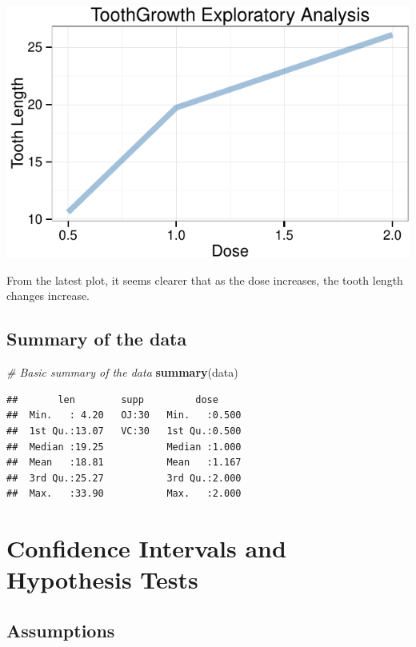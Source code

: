 \documentclass[]{article}
\newenvironment{Shaded}{\begin{snugshade}}{\end{snugshade}}
\newcommand{\KeywordTok}[1]{\textcolor[rgb]{0.13,0.29,0.53}{\textbf{{#1}}}}
\newcommand{\CommentTok}[1]{\textcolor[rgb]{0.56,0.35,0.01}{\textit{{#1}}}}
\newcommand{\NormalTok}[1]{{#1}}
\begin{document}
\includegraphics{statinference-courseproject-1-Question-2_files/figure-latex/unnamed-chunk-3-1.pdf}

From the latest plot, it seems clearer that as the dose increases, the
tooth length changes increase.

\subsection{Summary of the data}\label{summary-of-the-data}

\begin{Shaded}
\begin{Highlighting}[]
\CommentTok{# Basic summary of the data}
\KeywordTok{summary}\NormalTok{(data)}
\end{Highlighting}
\end{Shaded}

\begin{verbatim}
##       len        supp         dose      
##  Min.   : 4.20   OJ:30   Min.   :0.500  
##  1st Qu.:13.07   VC:30   1st Qu.:0.500  
##  Median :19.25           Median :1.000  
##  Mean   :18.81           Mean   :1.167  
##  3rd Qu.:25.27           3rd Qu.:2.000  
##  Max.   :33.90           Max.   :2.000
\end{verbatim}

\section{Confidence Intervals and Hypothesis
Tests}\label{confidence-intervals-and-hypothesis-tests}

\subsection{Assumptions}\label{assumptions}
\end{document}
